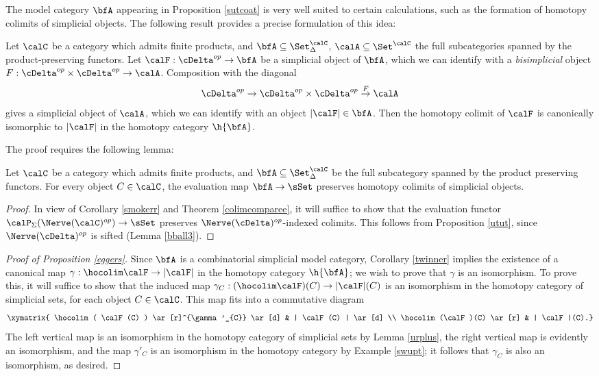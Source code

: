 The model category $\bfA$ appearing in Proposition \ref{sutcoat} is very well suited to certain calculations, such as the formation of homotopy colimits of simplicial objects. The following result provides a precise formulation of this idea:

\begin{proposition}\label{eggers}
Let $\calC$ be a category which admits finite products, and $\bfA \subseteq \Set_{\Delta}^{\calC}$,
$\calA \subseteq \Set^{\calC}$ the full subcategories spanned by the product-preserving functors. 
Let $\calF: \cDelta^{op} \rightarrow \bfA$ be a simplicial object of $\bfA$, which we can identify with a {\em bisimplicial} object $F: \cDelta^{op} \times \cDelta^{op} \rightarrow \calA$. Composition with the diagonal $$ \cDelta^{op} \rightarrow \cDelta^{op} \times \cDelta^{op} \stackrel{F}{\rightarrow} \calA$$ gives a simplicial object of $\calA$, which we can identify with an object $| \calF| \in \bfA$. Then the homotopy colimit of $\calF$ is canonically isomorphic to $|\calF|$ in the homotopy category $\h{\bfA}$.
\end{proposition}

The proof requires the following lemma:

\begin{lemma}\label{urplus}
Let $\calC$ be a category which admits finite products, and $\bfA \subseteq \Set_{\Delta}^{\calC}$
be the full subcategory spanned by the product preserving functors. For every object $C \in \calC$, the evaluation map $\bfA \rightarrow \sSet$ preserves homotopy colimits of simplicial objects.
\end{lemma}

\begin{proof}
In view of Corollary \ref{smokerr} and Theorem \ref{colimcomparee}, it will suffice to show that the evaluation functor $\calP_{\Sigma}( \Nerve(\calC)^{op} ) \rightarrow \sSet$ preserves
$\Nerve(\cDelta)^{op}$-indexed colimits. This follows from Proposition \ref{utut}, since
$\Nerve(\cDelta)^{op}$ is sifted (Lemma \ref{bball3}).
\end{proof}

\begin{proof}[Proof of Proposition \ref{eggers}]
Since $\bfA$ is a combinatorial simplicial model category, Corollary \ref{twinner} implies the existence of a canonical map $\gamma: \hocolim \calF \rightarrow | \calF |$ in the homotopy category $\h{\bfA}$; we wish to prove that $\gamma$ is an isomorphism. To prove this, it will suffice to show that
the induced map $\gamma_{C}: ( \hocolim \calF)(C) \rightarrow | \calF|(C)$ is an isomorphism in the homotopy category of simplicial sets, for each object $C \in \calC$. This map fits into a commutative diagram
$$ \xymatrix{ \hocolim( \calF(C) ) \ar[r]^{\gamma'_{C}} \ar[d] & | \calF(C) | \ar[d] \\
\hocolim(\calF)(C) \ar[r] & | \calF|(C).}$$
The left vertical map is an isomorphism in the homotopy category of simplicial sets by Lemma \ref{urplus}, the right vertical map is evidently an isomorphism, and the map $\gamma'_{C}$ is an isomorphism in the homotopy category by Example \ref{swupt}; it follows that $\gamma_{C}$ is also an isomorphism, as desired.
\end{proof}

